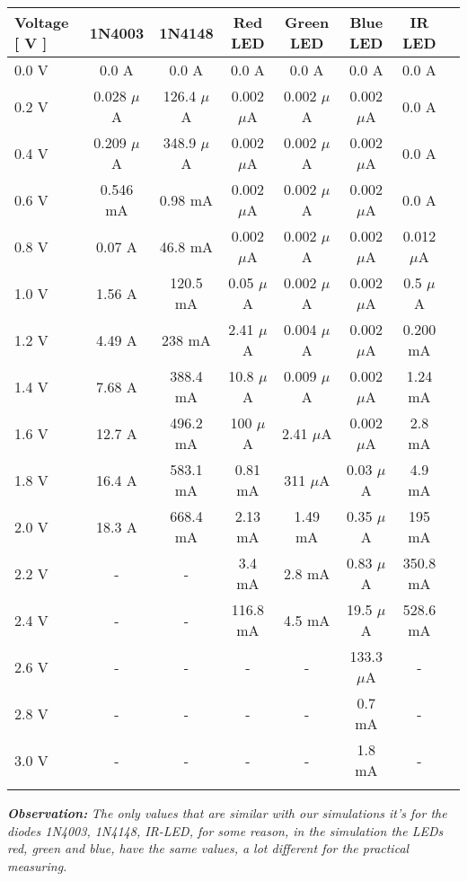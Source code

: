 \documentclass[10pt,a4paper]{article}
\begin{document}
\begin{center}
\begin{tabular}[.5cm]{l c c c c c c c }
\toprule
Voltage [ V ] & 1N4003 & 1N4148 & Red LED & Green LED & Blue LED & IR LED \\
\midrule
0.0 V & 0.0 A & 0.0 A & 0.0 A & 0.0 A & 0.0 A & 0.0 A \\
\cmidrule{1-7}
0.2 V & 0.028 $\mu$A & 126.4 $\mu$A & 0.002 $\mu$A & 0.002 $\mu$A & 0.002 $\mu$A & 0.0 A \\
\cmidrule{1-7}
0.4 V & 0.209 $\mu$A & 348.9 $\mu$A & 0.002 $\mu$A & 0.002 $\mu$A & 0.002 $\mu$A & 0.0 A \\
\cmidrule{1-7}
0.6 V & 0.546 mA & 0.98 mA & 0.002 $\mu$A & 0.002 $\mu$A & 0.002 $\mu$A & 0.0 A \\
\cmidrule{1-7}
0.8 V & 0.07 A & 46.8 mA & 0.002 $\mu$A & 0.002 $\mu$A & 0.002 $\mu$A & 0.012 $\mu$A \\
\cmidrule{1-7}
1.0 V & 1.56 A & 120.5 mA & 0.05 $\mu$A & 0.002 $\mu$A & 0.002 $\mu$A & 0.5 $\mu$A \\
\cmidrule{1-7}
1.2 V & 4.49 A & 238 mA & 2.41 $\mu$A & 0.004 $\mu$A & 0.002 $\mu$A & 0.200 mA \\
\cmidrule{1-7}
1.4 V & 7.68 A & 388.4 mA & 10.8 $\mu$A & 0.009 $\mu$A & 0.002 $\mu$A & 1.24 mA \\
\cmidrule{1-7}
1.6 V & 12.7 A & 496.2 mA & 100 $\mu$A & 2.41 $\mu$A & 0.002 $\mu$A & 2.8 mA \\
\cmidrule{1-7}
1.8 V & 16.4 A & 583.1 mA & 0.81 mA & 311 $\mu$A & 0.03 $\mu$A & 4.9 mA \\
\cmidrule{1-7}
2.0 V & 18.3 A & 668.4 mA & 2.13 mA & 1.49 mA & 0.35 $\mu$A & 195 mA \\
\cmidrule{1-7}
2.2 V & - & - & 3.4 mA & 2.8 mA & 0.83 $\mu$A & 350.8 mA \\
\cmidrule{1-7}
2.4 V & - & - & 116.8 mA & 4.5 mA & 19.5 $\mu$A & 528.6 mA \\
\cmidrule{1-7}
2.6 V & - & - & - & - & 133.3 $\mu$A & - \\
\cmidrule{1-7}
2.8 V & - & - & - & - & 0.7 mA & - \\
\cmidrule{1-7}
3.0 V & - & - & - & - & 1.8 mA & - \\
\bottomrule
\linebreak
\end{tabular}
\end{center} 

{\bfseries\itshape Observation:} {\itshape The only values that are similar with our simulations it's for the diodes 1N4003, 1N4148, IR-LED, for some reason, in the simulation the LEDs red, green and blue, have the same values, a lot different for the practical measuring.} 
\end{document}
